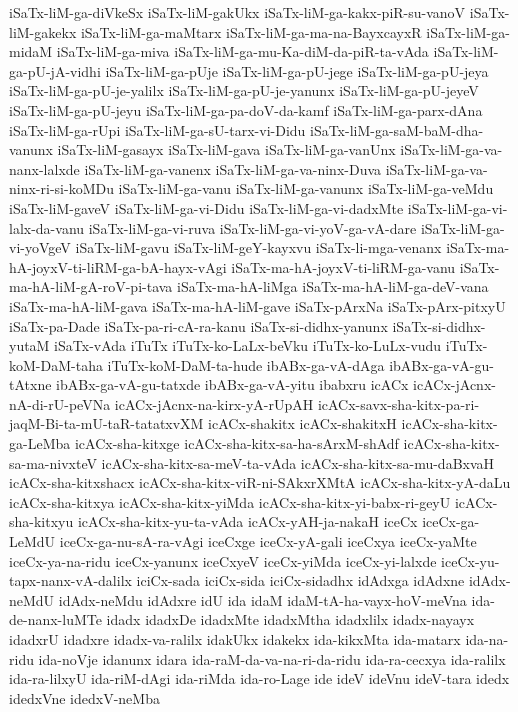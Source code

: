 {iSaTx-liM-ga-diVkeSx
iSaTx-liM-gakUkx
iSaTx-liM-ga-kakx-piR-su-vanoV
iSaTx-liM-gakekx
iSaTx-liM-ga-maMtarx
iSaTx-liM-ga-ma-na-BayxcayxR
iSaTx-liM-ga-midaM
iSaTx-liM-ga-miva
iSaTx-liM-ga-mu-Ka-diM-da-piR-ta-vAda
iSaTx-liM-ga-pU-jA-vidhi
iSaTx-liM-ga-pUje
iSaTx-liM-ga-pU-jege
iSaTx-liM-ga-pU-jeya
iSaTx-liM-ga-pU-je-yalilx
iSaTx-liM-ga-pU-je-yanunx
iSaTx-liM-ga-pU-jeyeV
iSaTx-liM-ga-pU-jeyu
iSaTx-liM-ga-pa-doV-da-kamf
iSaTx-liM-ga-parx-dAna
iSaTx-liM-ga-rUpi
iSaTx-liM-ga-sU-tarx-vi-Didu
iSaTx-liM-ga-saM-baM-dha-vanunx
iSaTx-liM-gasayx
iSaTx-liM-gava
iSaTx-liM-ga-vanUnx
iSaTx-liM-ga-va-nanx-lalxde
iSaTx-liM-ga-vanenx
iSaTx-liM-ga-va-ninx-Duva
iSaTx-liM-ga-va-ninx-ri-si-koMDu
iSaTx-liM-ga-vanu
iSaTx-liM-ga-vanunx
iSaTx-liM-ga-veMdu
iSaTx-liM-gaveV
iSaTx-liM-ga-vi-Didu
iSaTx-liM-ga-vi-dadxMte
iSaTx-liM-ga-vi-lalx-da-vanu
iSaTx-liM-ga-vi-ruva
iSaTx-liM-ga-vi-yoV-ga-vA-dare
iSaTx-liM-ga-vi-yoVgeV
iSaTx-liM-gavu
iSaTx-liM-geY-kayxvu
iSaTx-li-mga-venanx
iSaTx-ma-hA-joyxV-ti-liRM-ga-bA-hayx-vAgi
iSaTx-ma-hA-joyxV-ti-liRM-ga-vanu
iSaTx-ma-hA-liM-gA-roV-pi-tava
iSaTx-ma-hA-liMga
iSaTx-ma-hA-liM-ga-deV-vana
iSaTx-ma-hA-liM-gava
iSaTx-ma-hA-liM-gave
iSaTx-pArxNa
iSaTx-pArx-pitxyU
iSaTx-pa-Dade
iSaTx-pa-ri-cA-ra-kanu
iSaTx-si-didhx-yanunx
iSaTx-si-didhx-yutaM
iSaTx-vAda
iTuTx
iTuTx-ko-LaLx-beVku
iTuTx-ko-LuLx-vudu
iTuTx-koM-DaM-taha
iTuTx-koM-DaM-ta-hude
ibABx-ga-vA-dAga
ibABx-ga-vA-gu-tAtxne
ibABx-ga-vA-gu-tatxde
ibABx-ga-vA-yitu
ibabxru
icACx
icACx-jAcnx-nA-di-rU-peVNa
icACx-jAcnx-na-kirx-yA-rUpAH
icACx-savx-sha-kitx-pa-ri-jaqM-Bi-ta-mU-taR-tatatxvXM
icACx-shakitx
icACx-shakitxH
icACx-sha-kitx-ga-LeMba
icACx-sha-kitxge
icACx-sha-kitx-sa-ha-sArxM-shAdf
icACx-sha-kitx-sa-ma-nivxteV
icACx-sha-kitx-sa-meV-ta-vAda
icACx-sha-kitx-sa-mu-daBxvaH
icACx-sha-kitxshacx
icACx-sha-kitx-viR-ni-SAkxrXMtA
icACx-sha-kitx-yA-daLu
icACx-sha-kitxya
icACx-sha-kitx-yiMda
icACx-sha-kitx-yi-babx-ri-geyU
icACx-sha-kitxyu
icACx-sha-kitx-yu-ta-vAda
icACx-yAH-ja-nakaH
iceCx
iceCx-ga-LeMdU
iceCx-ga-nu-sA-ra-vAgi
iceCxge
iceCx-yA-gali
iceCxya
iceCx-yaMte
iceCx-ya-na-ridu
iceCx-yanunx
iceCxyeV
iceCx-yiMda
iceCx-yi-lalxde
iceCx-yu-tapx-nanx-vA-dalilx
iciCx-sada
iciCx-sida
iciCx-sidadhx
idAdxga
idAdxne
idAdx-neMdU
idAdx-neMdu
idAdxre
idU
ida
idaM
idaM-tA-ha-vayx-hoV-meVna
ida-de-nanx-luMTe
idadx
idadxDe
idadxMte
idadxMtha
idadxlilx
idadx-nayayx
idadxrU
idadxre
idadx-va-ralilx
idakUkx
idakekx
ida-kikxMta
ida-matarx
ida-na-ridu
ida-noVje
idanunx
idara
ida-raM-da-va-na-ri-da-ridu
ida-ra-cecxya
ida-ralilx
ida-ra-lilxyU
ida-riM-dAgi
ida-riMda
ida-ro-Lage
ide
ideV
ideVnu
ideV-tara
idedx
idedxVne
idedxV-neMba
}
